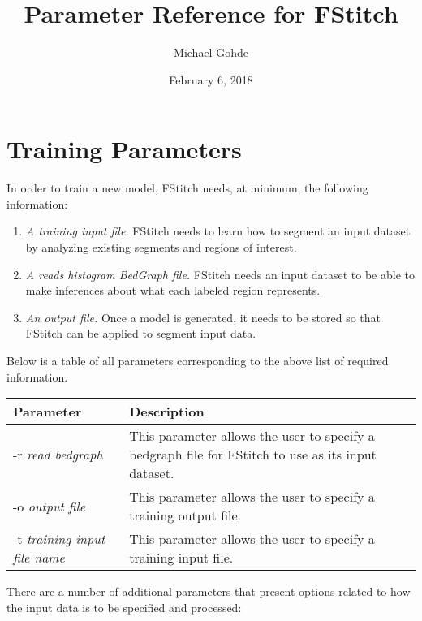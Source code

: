 \documentclass[12pt,letterpaper]{article}
\begin{document}
\title{Parameter Reference for FStitch}
\author{Michael Gohde}
\date{February 6, 2018}
\maketitle


\section{Training Parameters}

In order to train a new model, FStitch needs, at minimum, the following information:
\begin{enumerate}
 \item \textit{A training input file.} FStitch needs to learn how to segment an input dataset by analyzing existing segments and regions of interest.
 \item \textit{A reads histogram BedGraph file.} FStitch needs an input dataset to be able to make inferences about what each labeled region represents.
 \item \textit{An output file.} Once a model is generated, it needs to be stored so that FStitch can be applied to segment input data.
\end{enumerate}

Below is a table of all parameters corresponding to the above list of required information. 

\begin{tabular}{| p{5cm} | p{8cm} |}
 \hline
 \textbf{Parameter} & \textbf{Description}\\
 \hline
 -r \textit{read bedgraph} & This parameter allows the user to specify a bedgraph file for FStitch to use as its input dataset.\\
 \hline
 -o \textit{output file} & This parameter allows the user to specify a training output file.\\
 \hline
 -t \textit{training input file name} & This parameter allows the user to specify a training input file.\\
 \hline
\end{tabular}

There are a number of additional parameters that present options related to how the input data is to be specified and processed:
\end{document}
